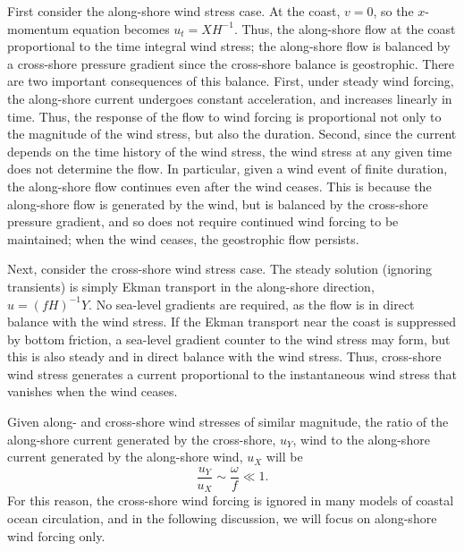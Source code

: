 \documentclass[11pt]{report}
\numberwithin{equation}{section}
\begin{document}
First consider the along-shore wind stress case.  At the coast, $v=0$, so the $x$-momentum equation becomes $u_t = X H^{-1}$.  Thus, the along-shore flow at the coast proportional to the time integral wind stress; the along-shore flow is balanced by a cross-shore pressure gradient since the cross-shore balance is geostrophic.  There are two important consequences of this balance.  First, under steady wind forcing, the along-shore current undergoes constant acceleration, and increases linearly in time.  Thus, the response of the flow to wind forcing is proportional not only to the magnitude of the wind stress, but also the duration.  Second, since the current depends on the time history of the wind stress, the wind stress at any given time does not determine the flow.  In particular, given a wind event of finite duration, the along-shore flow continues even after the wind ceases.  This is because the along-shore flow is generated by the wind, but is balanced by the cross-shore pressure gradient, and so does not require continued wind forcing to be maintained; when the wind ceases, the geostrophic flow persists.

Next, consider the cross-shore wind stress case.  The steady solution (ignoring transients) is simply Ekman transport in the along-shore direction, $u = (f H)^{-1} Y$.  No sea-level gradients are required, as the flow is in direct balance with the wind stress.  If the Ekman transport near the coast is suppressed  by bottom friction, a sea-level gradient counter to the wind stress may form, but this is also steady and in direct balance with the wind stress.  Thus, cross-shore wind stress generates a current proportional to the instantaneous wind stress that vanishes when the wind ceases.

Given along- and cross-shore wind stresses of similar magnitude, the ratio of the along-shore current generated by the cross-shore, $u_Y$, wind to the along-shore current generated by the along-shore wind, $u_X$ will be
\begin{equation}
    \frac{u_Y}{u_X} \sim \frac{\omega}{f} \ll 1.
\end{equation}
For this reason, the cross-shore wind forcing is ignored in many models of coastal ocean circulation, and in the following discussion, we will focus on along-shore wind forcing only.
\end{document}
